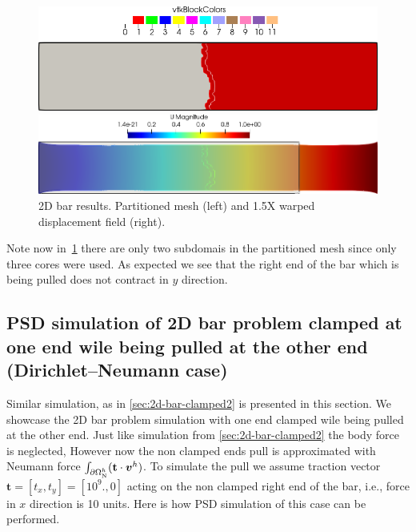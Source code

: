 \documentclass{report}
\newcommand{\bvh}{\boldsymbol v^h}
\begin{document}
\begin{figure}[htbp]
    \centering
    \begin{minipage}[t][2cm][t]{0.39\textwidth}
    \includegraphics[align=t,width=1\textwidth]{./Images/2d-bar-clamped-pulled-partioned.png}
    \end{minipage}\hspace{.1\textwidth}
    \begin{minipage}[t][2cm][t]{0.5\textwidth}
    \includegraphics[align=t,width=1\textwidth]{./Images/2d-bar-clamped-pulled.png}
    \end{minipage}
    \caption{2D bar results. Partitioned mesh (left) and 1.5X warped displacement field (right).}
    \label{fig:2part}
\end{figure}

Note now in~\cref{fig:2part} there are only two subdomais in the partitioned mesh since only three cores were used. As expected we see that the right end of the bar which is being pulled does not contract in $y$ direction.
\pagebreak


\subsection{PSD simulation of 2D bar problem clamped at one end wile being pulled at the other end (Dirichlet--Neumann case)\label{sec:2d-bar-clamped3}}


Similar simulation, as in \cref{sec:2d-bar-clamped2} is presented in this section. We showcase the 2D bar problem simulation with one end clamped wile being pulled at the other end. Just like simulation from \cref{sec:2d-bar-clamped2} the body force is neglected, However now  the non clamped ends pull is approximated with Neumann force $\int_{\partial\Omega^h_{\text N}}(\mathbf t\cdot \bvh)$. To simulate the pull we assume traction vector $\mathbf t=[t_x,t_y]=[10^9.,0]$ acting on the non clamped right end of the bar, i.e., force in $x$ direction is 10 units. Here is how PSD simulation of this case can be performed.
\end{document}
